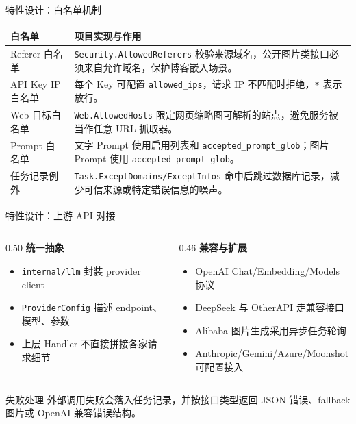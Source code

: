 \documentclass[aspectratio=169,UTF8]{ctexbeamer}
\newcommand{\code}[1]{\texttt{#1}}
\begin{document}
\begin{frame}{特性设计：白名单机制}
  \begin{table}
    \small
    \begin{tabularx}{\linewidth}{lX}
      \toprule
      白名单 & 项目实现与作用 \\
      \midrule
      Referer 白名单 & \code{Security.AllowedReferers} 校验来源域名，公开图片类接口必须来自允许域名，保护博客嵌入场景。 \\
      API Key IP 白名单 & 每个 Key 可配置 \code{allowed\_ips}，请求 IP 不匹配时拒绝，\code{*} 表示放行。 \\
      Web 目标白名单 & \code{Web.AllowedHosts} 限定网页缩略图可解析的站点，避免服务被当作任意 URL 抓取器。 \\
      Prompt 白名单 & 文字 Prompt 使用启用列表和 \code{accepted\_prompt\_glob}；图片 Prompt 使用 \code{accepted\_prompt\_glob}。 \\
      任务记录例外 & \code{Task.ExceptDomains/ExceptInfos} 命中后跳过数据库记录，减少可信来源或特定错误信息的噪声。 \\
      \bottomrule
    \end{tabularx}
  \end{table}
\end{frame}

\begin{frame}{特性设计：上游 API 对接}
  \begin{columns}[T]
    \begin{column}{0.50\linewidth}
      \textbf{统一抽象}
      \begin{itemize}
        \item \code{internal/llm} 封装 provider client
        \item \code{ProviderConfig} 描述 endpoint、模型、参数
        \item 上层 Handler 不直接拼接各家请求细节
      \end{itemize}
    \end{column}
    \begin{column}{0.46\linewidth}
      \textbf{兼容与扩展}
      \begin{itemize}
        \item OpenAI Chat/Embedding/Models 协议
        \item DeepSeek 与 OtherAPI 走兼容接口
        \item Alibaba 图片生成采用异步任务轮询
        \item Anthropic/Gemini/Azure/Moonshot 可配置接入
      \end{itemize}
    \end{column}
  \end{columns}

  \vspace{0.4cm}
  \begin{block}{失败处理}
    外部调用失败会落入任务记录，并按接口类型返回 JSON 错误、fallback 图片或 OpenAI 兼容错误结构。
  \end{block}
\end{frame}
\end{document}
